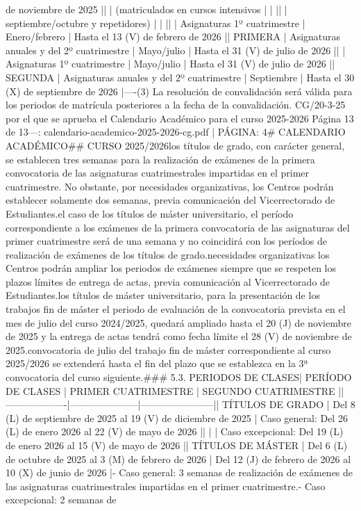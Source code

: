 \documentclass{article}
\begin{document}
\begin{itemize}
{de noviembre de 2025              |\n|              | (matriculados en cursos intensivos            |                     |                                                   |\n|              | septiembre/octubre y repetidores)            |                     |                                                   |\n|              | Asignaturas 1º cuatrimestre                  | Enero/febrero       | Hasta el 13 (V) de febrero de 2026                |\n| PRIMERA      | Asignaturas anuales y del 2º cuatrimestre    | Mayo/julio          | Hasta el 31 (V) de julio de 2026                  |\n|              | Asignaturas 1º cuatrimestre                  | Mayo/julio          | Hasta el 31 (V) de julio de 2026                  |\n| SEGUNDA      | Asignaturas anuales y del 2º cuatrimestre    | Septiembre          | Hasta el 30 (X) de septiembre de 2026             |\n\n----\n(3) La resolución de convalidación será válida para los periodos de matrícula posteriores a la fecha de la convalidación.\n{} CG/20-3-25 por el que se aprueba el Calendario Académico para el curso 2025-2026      Página 13 de 13\n\n---\n\nFUENTE: calendario-academico-2025-2026-cg.pdf | PÁGINA: 4\n# CALENDARIO ACADÉMICO\n## CURSO 2025/2026\n\nEn los títulos de grado, con carácter general, se establecen tres semanas para la realización de exámenes de la primera convocatoria de las asignaturas cuatrimestrales impartidas en el primer cuatrimestre. No obstante, por necesidades organizativas, los Centros podrán establecer solamente dos semanas, previa comunicación del Vicerrectorado de Estudiantes.\n\nPara el caso de los títulos de máster universitario, el período correspondiente a los exámenes de la primera convocatoria de las asignaturas del primer cuatrimestre será de una semana y no coincidirá con los períodos de realización de exámenes de los títulos de grado.\n\nPor necesidades organizativas los Centros podrán ampliar los periodos de exámenes siempre que se respeten los plazos límites de entrega de actas, previa comunicación al Vicerrectorado de Estudiantes.\n\nEn los títulos de máster universitario, para la presentación de los trabajos fin de máster el periodo de evaluación de la convocatoria prevista en el mes de julio del curso 2024/2025, quedará ampliado hasta el 20 (J) de noviembre de 2025 y la entrega de actas tendrá como fecha límite el 28 (V) de noviembre de 2025.\n\nLa convocatoria de julio del trabajo fin de máster correspondiente al curso 2025/2026 se extenderá hasta el fin del plazo que se establezca en la 3ª convocatoria del curso siguiente.\n\n### 5.3. PERIODOS DE CLASES\n\n| PERÍODO DE CLASES | PRIMER CUATRIMESTRE | SEGUNDO CUATRIMESTRE |\n|-------------------|---------------------|-----------------------|\n| TÍTULOS DE GRADO  | Del 8 (L) de septiembre de 2025 al 19 (V) de diciembre de 2025 | Caso general: Del 26 (L) de enero 2026 al 22 (V) de mayo de 2026 |\n|                   |                     | Caso excepcional: Del 19 (L) de enero 2026 al 15 (V) de mayo de 2026 |\n| TÍTULOS DE MÁSTER | Del 6 (L) de octubre de 2025 al 3 (M) de febrero de 2026 | Del 12 (J) de febrero de 2026 al 10 (X) de junio de 2026 |\n\n- Caso general: 3 semanas de realización de exámenes de las asignaturas cuatrimestrales impartidas en el primer cuatrimestre.\n- Caso excepcional: 2 semanas de }
\end{itemize}
\end{document}
